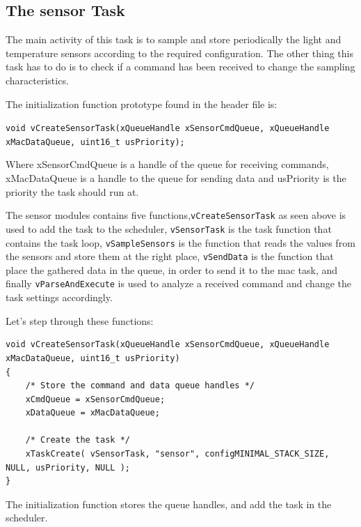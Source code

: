 \documentclass[11pt]{report}
\begin{document}
\subsection{The sensor Task}
The main activity of this task is to sample and store periodically the light and temperature sensors according to the required configuration. The other thing this task has to do is to check if a command has been received to change the sampling characteristics.

The initialization function prototype found in the header file is:

\verb$void vCreateSensorTask(xQueueHandle xSensorCmdQueue, xQueueHandle xMacDataQueue, uint16_t usPriority);$

Where xSensorCmdQueue is a handle of the queue for receiving commands, xMacDataQueue is a handle to the queue for sending data and usPriority is the priority the task should run at.

The sensor modules contains five functions,\verb$vCreateSensorTask$ as seen above is used to add the task to the scheduler, \verb$vSensorTask$ is the task function that contains the task loop, \verb$vSampleSensors$ is the function that reads the values from the sensors and store them at the right place, \verb$vSendData$ is the function that place the gathered data in the queue, in order to send it to the mac task, and finally \verb$vParseAndExecute$ is used to analyze a received command and change the task settings accordingly.

Let's step through these functions:
\begin{verbatim}
void vCreateSensorTask(xQueueHandle xSensorCmdQueue, xQueueHandle xMacDataQueue, uint16_t usPriority)
{
    /* Store the command and data queue handles */
    xCmdQueue = xSensorCmdQueue;
    xDataQueue = xMacDataQueue;
    
    /* Create the task */
    xTaskCreate( vSensorTask, "sensor", configMINIMAL_STACK_SIZE, NULL, usPriority, NULL );
}
\end{verbatim}

The initialization function stores the queue handles, and add the task in the scheduler.
\end{document}
